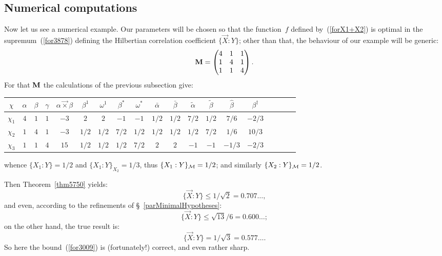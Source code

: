 \subsection{Numerical computations}\label{par411}

Now let us see a numerical example.
Our parameters will be chosen so that the function~$f$ defined by~(\ref{forX1+X2})
is optimal in the supremum~(\ref{for3878})
defining the Hilbertian correlation coefficient ${\{\vec{X}:Y\}}$;
other than that, the behaviour of our example will be generic:
\[ \mathbf{M} = \begin{pmatrix} 4&1&1 \\ 1&4&1 \\ 1&1&4 \end{pmatrix} .\]
%
For that $\mathbf{M}$ the calculations of the previous subsection give:

\begin{center}
\renewcommand\tabcolsep{5pt}
\noindent\begin{tabular}{|c||c|c|c|c|c|c|c|c|c|c|c|c|c|c|c|c|c|c|}
\hline
$\chi$  & $\alpha$ & $\beta$ & $\gamma$ & $\alpha\vec{\times}\beta$ &
$\beta^1$ & $\omega^1$ & $\beta^*$ & $\omega^*$ &
$\bar{\alpha}$ & $\bar{\beta}$ & $\tilde{\alpha}$ & $\tilde{\beta}$ & 
$\hat{\beta}$ & $\beta^\dag$ \\
\hline\hline
$\chi_1$ & $4$ & $1$ & $1$ & $-3$ & $2$  & $2$  & $-1$ & $-1$  & $1/2$ & $1/2$ & $7/2$ & $1/2$ & $7/6$ & $-2/3$ \\
\hline
$\chi_2$ & $1$ & $4$ & $1$ & $-3$ & $1/2$ & $1/2$ & $7/2$ & $1/2$ & $1/2$ & $1/2$ & $1/2$ & $7/2$ & $1/6$ & $10/3$ \\
\hline
$\chi_3$ & $1$ & $1$ & $4$ & $15$ & $1/2$ & $1/2$ & $1/2$ & $7/2$ & $2$  & $2$  & $-1$ & $-1$ & $-1/3$ & $-2/3$ \\
\hline
\end{tabular}
\end{center}

\noindent whence $\{X_1:Y\} = 1/2$ and $\{X_1:Y\}_{X_2} = 1/3$,
thus $\{X_1:Y\}_{\mathcal{M}} = 1/2$;
and similarly $\{X_2:Y\}_{\mathcal{M}} = 1/2$.

Then Theorem~\ref{thm5750} yields:
\[ \{ \vec{X} : Y \} \leq 1/\sqrt{2} = 0.707\ldots ,\]
and even, according to the refinements of \S~\ref{parMinimalHypotheses}:
\[ \{ \vec{X} : Y \} \leq \sqrt{13}/6 = 0.600\ldots ;\]
on the other hand, the true result is:
\[ \{ \vec{X} : Y \} = 1/\sqrt{3} = 0.577\ldots .\]
So here the bound~(\ref{for3009}) is (fortunately!) correct, and even rather sharp.


